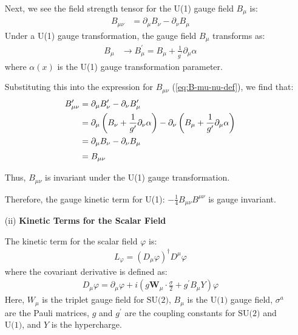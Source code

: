 \begin{enumerate}
Next, we see the field strength tensor for the U(1) gauge field $B_\mu$ is:
\begin{align}
    B_{\mu\nu} &= \partial_\mu B_\nu - \partial_\nu B_\mu\label{eq:B-mu-nu-def}
\end{align}
Under a U(1) gauge transformation, the gauge field $B_\mu$ transforms as:
\begin{align}
    B_\mu &\to B_\mu^\prime = B_\mu + \frac{1}{g^\prime } \partial_\mu \alpha\label{eq:B-mu-nu-transformation}
\end{align}
where $\alpha(x)$ is the U(1) gauge transformation parameter.

Substituting this into the expression for $B_{\mu\nu}$ (\ref{eq:B-mu-nu-def}), we find that:
\begin{align}
    B_{\mu\nu}^\prime &= \partial_\mu B_\nu^\prime - \partial_\nu B_\mu^\prime \notag \\
    &= \partial_\mu \left( B_\nu + \frac{1}{g^\prime } \partial_\nu \alpha \right) - \partial_\nu \left( B_\mu + \frac{1}{g^\prime } \partial_\mu \alpha \right) \notag \\
    &= \partial_\mu B_\nu - \partial_\nu B_\mu \notag \\[3pt]
    &= B_{\mu\nu}
\end{align}

Thus, $B_{\mu\nu}$ is invariant under the U(1) gauge transformation.

Therefore, the gauge kinetic term for U(1): $\displaystyle- \frac{1}{4} B_{\mu\nu} B^{\mu\nu}$ is gauge invariant.

\item [(ii)] \textbf{Kinetic Terms for the Scalar Field}

The kinetic term for the scalar field $\varphi$ is:
\begin{align}
    L_{\varphi} = (D_\mu \varphi)^\dagger D^\mu \varphi
\end{align}
where the covariant derivative is defined as:
\begin{align}
    D_\mu \varphi = \partial_\mu \varphi + i \left( g \mathbf{W}_\mu \cdot \frac{\sigma}{2} + g^\prime B_\mu Y \right) \varphi
\end{align}
Here, $W_\mu$ is the triplet gauge field for $\text{SU(2)}$, $B_\mu$ is the $\text{U(1)}$ gauge field, $\sigma^a$ are the Pauli matrices, $g$ and $g^\prime $ are the coupling constants for $\text{SU(2)}$ and $\text{U(1)}$, and $Y$ is the hypercharge.


\end{enumerate}
